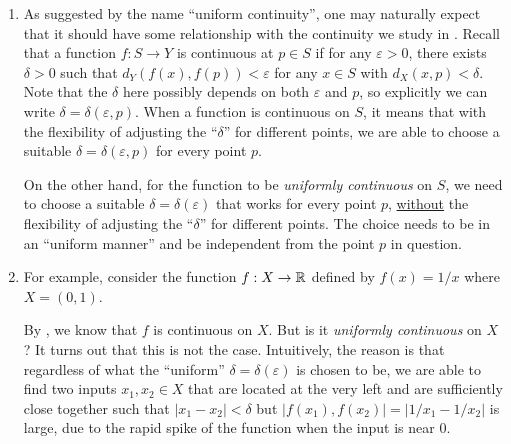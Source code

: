\begin{enumerate}
\item As suggested by the name ``uniform continuity'', one may naturally expect
that it should have some relationship with the continuity we study in
. Recall that a function \(f:S\to Y\) is
continuous at \(p\in S\) if for any \(\varepsilon>0\), there exists
\(\delta>0\) such that \(d_Y(f(x),f(p))<\varepsilon\) for any \(x\in S\) with
\(d_X(x,p)<\delta\). Note that the \(\delta\) here possibly depends on both
\(\varepsilon\) and \(p\), so explicitly we can write
\(\delta=\delta(\varepsilon,p)\). When a function is continuous on \(S\), it
means that with the flexibility of adjusting the ``\(\delta\)'' for different
points, we are able to choose a suitable \(\delta=\delta(\varepsilon,p)\) for
every point \(p\).

On the other hand, for the function to be \emph{uniformly continuous} on \(S\),
we need to choose a suitable \(\delta=\delta(\varepsilon)\) that works for
every point \(p\), \underline{without} the flexibility of adjusting the
``\(\delta\)'' for different points. The choice needs to be in an ``uniform
manner'' and be independent from the point \(p\) in question.

\item \label{it:cts-but-not-unif-cts}
For example, consider the function \(f:X\to\mathbb{R}\) defined by \(f(x)=1/x\)
where \(X=(0,1)\).
\begin{center}
\end{center}
By , we know that \(f\) is continuous on \(X\). But is it
\emph{uniformly continuous} on \(X\)? It turns out that this is not the case.
Intuitively, the reason is that regardless of what the ``uniform''
\(\delta=\delta(\varepsilon)\) is chosen to be, we are able to find two inputs
\(x_1,x_2\in X\) that are located at the very left and are sufficiently close
together such that \(|x_1-x_2|<\delta\) but \(|f(x_1),f(x_2)|=|1/x_1-1/x_2|\)
is large, due to the rapid spike of the function when the input is near \(0\).
\begin{center}
\end{center}


\end{enumerate}
